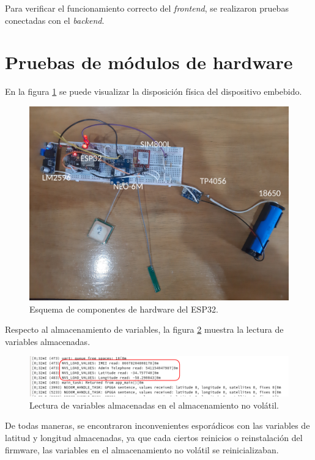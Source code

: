 Para verificar el funcionamiento correcto del \textit{frontend}, se realizaron pruebas conectadas con el \textit{backend}.

\section{Pruebas de módulos de hardware}

En la figura \ref{fig:esp32:fisico} se puede visualizar la disposición física del dispositivo embebido.
\begin{figure}[H]
	\centering
	\includegraphics[width=1\textwidth]{./Figures/esp32-fisico.jpg}
	\caption{Esquema de componentes de hardware del ESP32.}
	\label{fig:esp32:fisico}
\end{figure}

Respecto al almacenamiento de variables, la figura \ref{fig:esp32:nvs} muestra la lectura de variables almacenadas.

\begin{figure}[H]
	\centering
	\includegraphics[width=1\textwidth]{./Figures/esp32-nvs.png}
	\caption{Lectura de variables almacenadas en el almacenamiento no volátil.}
	\label{fig:esp32:nvs}
\end{figure}

De todas maneras, se encontraron inconvenientes esporádicos con las variables de latitud y longitud almacenadas, ya que cada ciertos reinicios o reinstalación del firmware, las variables en el almacenamiento no volátil se reinicializaban.

